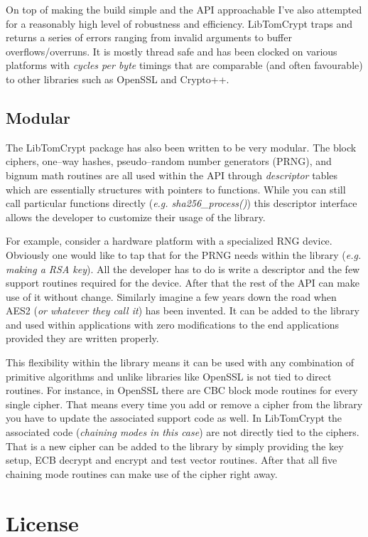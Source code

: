 \documentclass[synpaper]{book}
\newcommand{\mysection}[1]    %
	{                   %
	\section{#1}
   \markboth{\textsf{www.libtom.org}}{\thesection ~ {#1}}
	}
\begin{document}
On top of making the build simple and the API approachable I've also attempted for a reasonably high level of
robustness and efficiency.  LibTomCrypt traps and returns a series of errors ranging from invalid
arguments to buffer overflows/overruns.  It is mostly thread safe and has been clocked on various platforms
with \textit{cycles per byte} timings that are comparable (and often favourable) to other libraries such as OpenSSL and
Crypto++.

\subsection{Modular}
The LibTomCrypt package has also been written to be very modular.  The block ciphers, one--way hashes,
pseudo--random number generators (PRNG), and bignum math routines are all used within the API through \textit{descriptor} tables which
are essentially structures with pointers to functions.  While you can still call particular functions
directly (\textit{e.g. sha256\_process()}) this descriptor interface allows the developer to customize their
usage of the library.

For example, consider a hardware platform with a specialized RNG device.  Obviously one would like to tap
that for the PRNG needs within the library (\textit{e.g. making a RSA key}).  All the developer has to do
is write a descriptor and the few support routines required for the device.  After that the rest of the
API can make use of it without change.  Similarly imagine a few years down the road when AES2
(\textit{or whatever they call it}) has been invented.  It can be added to the library and used within applications
with zero modifications to the end applications provided they are written properly.

This flexibility within the library means it can be used with any combination of primitive algorithms and
unlike libraries like OpenSSL is not tied to direct routines.  For instance, in OpenSSL there are CBC block
mode routines for every single cipher.  That means every time you add or remove a cipher from the library
you have to update the associated support code as well.  In LibTomCrypt the associated code (\textit{chaining modes in this case})
are not directly tied to the ciphers.  That is a new cipher can be added to the library by simply providing
the key setup, ECB decrypt and encrypt and test vector routines.  After that all five chaining mode routines
can make use of the cipher right away.

\mysection{License}
\end{document}
